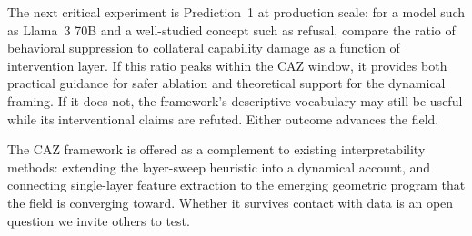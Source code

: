\documentclass[11pt,a4paper]{article}
\begin{document}
The next critical experiment is Prediction~1 at production scale: for a model such
as Llama~3 70B and a well-studied concept such as refusal, compare the ratio of
behavioral suppression to collateral capability damage as a function of intervention
layer. If this ratio peaks within the CAZ window, it provides both practical guidance
for safer ablation and theoretical support for the dynamical framing. If it does not,
the framework's descriptive vocabulary may still be useful while its interventional
claims are refuted. Either outcome advances the field.

The CAZ framework is offered as a complement to existing interpretability methods:
extending the layer-sweep heuristic into a dynamical account, and connecting
single-layer feature extraction to the emerging geometric program that the field
is converging toward. Whether it survives contact with data is an open question
we invite others to test.



\end{document}
